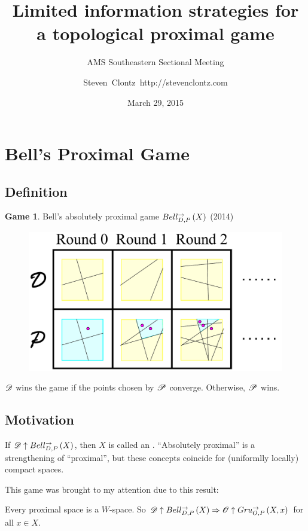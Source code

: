 \documentclass{beamer}
\title
{Limited information strategies for a topological proximal game}
\subtitle
{AMS Southeastern Sectional Meeting} %
\author%
{Steven~Clontz~http://stevenclontz.com}%
\institute[Auburn University] %
{
  Department of Mathematics and Statistics\\
  Auburn University}
\date[15-03-29] %
{March 29, 2015}
\theoremstyle{definition}
\newtheorem{game}[theorem]{Game}
\begin{document}
\renewcommand{\pause}{}
\newcommand{\vspacing}{\vspace{1em}}
\newcommand{\vpause}{\pause\vspacing}

\begin{frame}
  \titlepage
\end{frame}


\section{Bell's Proximal Game}

\subsection{Definition}

\begin{frame}
  \small
  \begin{game}
  Bell's absolutely proximal game $Bell_{D,P}^{\to}\left({X}\right)$ \cite{MR3239205} (2014)
    \begin{figure}
      \includegraphics[width=0.6\linewidth]{proximalGameAlt.pdf}
    \end{figure}

  $\mathscr{D}$ wins the game if the points chosen by $\mathscr{P}$ converge.
  Otherwise, $\mathscr{P}$ wins.
  \end{game}
\end{frame}

\subsection{Motivation}

\begin{frame}
  If $\mathscr{D}\uparrow Bell_{D,P}^{\to}\left({X}\right)$, then $X$ is called an
  .
  ``Absolutely proximal'' is a strengthening of ``proximal'', but these
  concepts coincide for (uniformlly locally) compact spaces.

  \vpause

  This game was brought to my attention due to this result: \cite{MR3239205}

  \begin{theorem}
    Every proximal space is a $W$-space. So
    $\mathscr{D}\uparrow Bell_{D,P}^{\to}\left({X}\right) \Rightarrow \mathscr{O}\uparrow Gru_{O,P}^{\to}\left({X},{x}\right)$
    for all $x\in X$.
  \end{theorem}
\end{frame}
\end{document}
